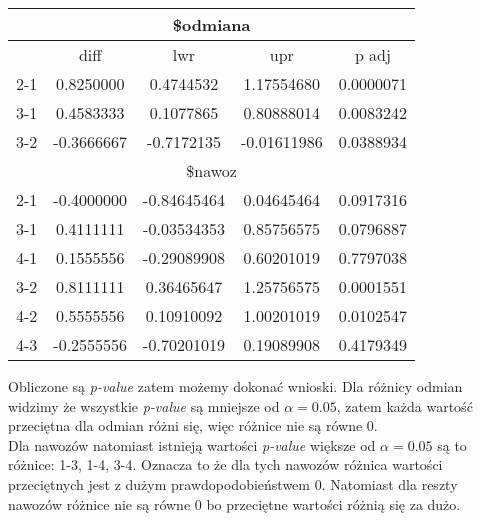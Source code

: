 \documentclass{article}
\begin{document}
\begin{center} \begin{tabular}{|c|c|c|c|c|} \hline
\multicolumn{5}{|c|}{\$odmiana} \\ \hline
& diff & lwr & upr & p adj \\ \hline
2-1 & 0.8250000 & 0.4744532 & 1.17554680 & 0.0000071 \\ \hline
3-1 & 0.4583333 & 0.1077865 & 0.80888014 & 0.0083242 \\ \hline
3-2 & -0.3666667 & -0.7172135 & -0.01611986 & 0.0388934 \\ \hline
\multicolumn{5}{|c|}{\$nawoz} \\ \hline
2-1 & -0.4000000 & -0.84645464 & 0.04645464 & 0.0917316 \\ \hline
3-1 & 0.4111111 & -0.03534353 & 0.85756575 & 0.0796887 \\ \hline
4-1 & 0.1555556 & -0.29089908 & 0.60201019 & 0.7797038 \\ \hline
3-2 & 0.8111111 & 0.36465647 & 1.25756575 & 0.0001551 \\ \hline
4-2 & 0.5555556 & 0.10910092 & 1.00201019 & 0.0102547 \\ \hline
4-3 & -0.2555556 & -0.70201019 & 0.19089908 & 0.4179349 \\ \hline
\end{tabular} \end{center}

Obliczone są \textit{p-value} zatem możemy dokonać wnioski. Dla różnicy odmian widzimy że wszystkie \textit{p-value} są mniejsze od $\alpha = 0.05$, zatem każda wartość przeciętna dla odmian różni się, więc różnice nie są równe 0. \\
Dla nawozów natomiast istnieją wartości \textit{p-value} większe od $\alpha = 0.05$ są to różnice: 1-3, 1-4, 3-4. Oznacza to że dla tych nawozów różnica wartości przeciętnych jest z dużym prawdopodobieństwem 0. Natomiast dla reszty nawozów różnice nie są równe 0 bo przeciętne wartości różnią się za dużo.
\end{document}

